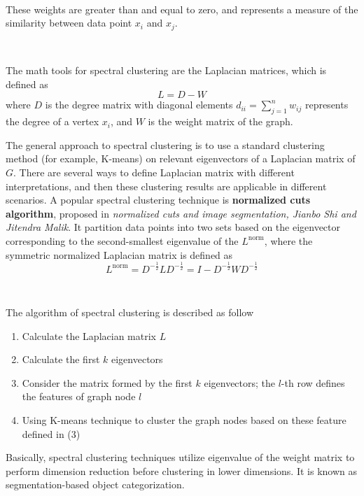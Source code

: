 \documentclass[a4paper]{article}
\begin{document}
\


These weights are greater than and equal to zero, and represents a measure of the similarity between data point $x_i$ and $x_j$.

\

The math tools for spectral clustering are the Laplacian matrices, which is defined as 
\begin{equation}
	L = D-W
\end{equation}
where $D$ is the degree matrix with diagonal elements $d_{ii} = \sum_{j=1}^{n} w_{ij}$ represents the degree of a vertex $x_i$, and $W$ is the weight matrix of the graph. 

The general approach to spectral clustering is to use a standard clustering method (for example, K-means) on relevant eigenvectors of a Laplacian matrix of $G$. There are several ways to define Laplacian matrix with different interpretations, and then these clustering results are applicable in different scenarios. A popular spectral clustering technique is \textbf{normalized cuts algorithm}, proposed in \textit{normalized cuts and image segmentation, Jianbo Shi and Jitendra Malik}. It partition data points into two sets based on the eigenvector corresponding to the second-smallest eigenvalue of the $L^{\mbox{norm}}$, where the symmetric normalized Laplacian matrix is defined as 
\begin{equation}
	L^{\mbox{norm}} = D^{-\frac{1}{2}} L D^{-\frac{1}{2}}  =I - D^{-\frac{1}{2}} W D^{-\frac{1}{2}}
\end{equation}


\

The algorithm of spectral clustering is described as follow

\begin{enumerate}
	\item Calculate the Laplacian matrix $L$
	\item Calculate the first $k$ eigenvectors
	\item Consider the matrix formed by the first $k$ eigenvectors; the $l$-th row defines the features of graph node $l$
	\item Using K-means technique to cluster the graph nodes based on these feature defined in (3)
\end{enumerate}

Basically, spectral clustering techniques utilize eigenvalue of the weight matrix to perform dimension reduction before clustering in lower dimensions. It is known as segmentation-based object categorization.
\end{document}
